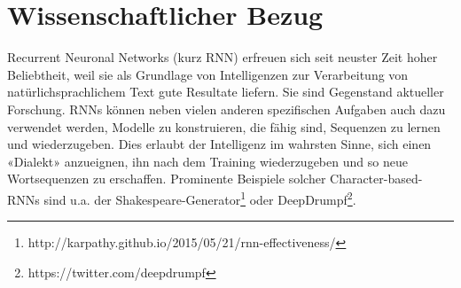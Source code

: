 \section*{Wissenschaftlicher Bezug}
\label{sec:scientific-relevance}

\guillemotleft Recurrent Neuronal Networks\guillemotright{} (kurz RNN) erfreuen sich seit neuster Zeit hoher Beliebtheit, weil sie als Grundlage von Intelligenzen zur Verarbeitung
von natürlichsprachlichem Text gute Resultate liefern.
Sie sind Gegenstand aktueller Forschung.
RNNs können neben vielen anderen spezifischen Aufgaben auch dazu verwendet werden, Modelle zu konstruieren, die fähig sind,
Sequenzen zu lernen und wiederzugeben.
Dies erlaubt der Intelligenz im wahrsten Sinne, sich einen «Dialekt» anzueignen, ihn nach dem Training wiederzugeben und so neue Wortsequenzen zu erschaffen.
Prominente Beispiele solcher \guillemotleft Character-based-RNNs\guillemotright{} sind u.a.
der Shakespeare-Generator\footnote{http://karpathy.github.io/2015/05/21/rnn-effectiveness/} oder DeepDrumpf\footnote{https://twitter.com/deepdrumpf}.

